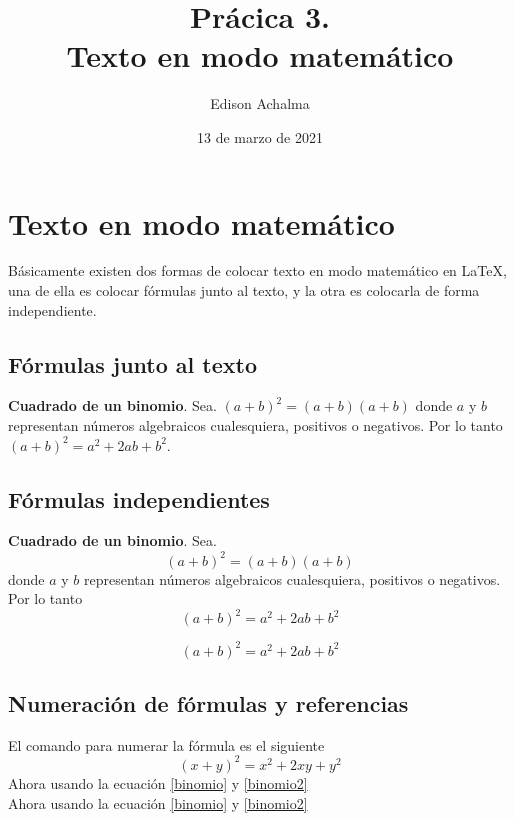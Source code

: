 \documentclass[12pt]{article}
\begin{document}
\title{Prácica 3. \\ Texto en modo matemático}
\author{Edison Achalma}
\date{13 de marzo de 2021}
\maketitle
\tableofcontents
\section{Texto en modo matemático}
Básicamente existen dos formas de colocar texto en modo matemático en \LaTeX, una de ella es colocar fórmulas junto al texto, y la otra es colocarla de forma independiente.

\subsection{Fórmulas junto al texto}
\textbf{Cuadrado de un binomio}. Sea. $ (a+b)^{2} = (a+b)(a+b) $ donde $ a $ y $ b $ representan números algebraicos cualesquiera, positivos o negativos. Por lo tanto $ (a+b)^{2} =a^{2}+2ab+b^{2}$.

\subsection{Fórmulas independientes}
\textbf{Cuadrado de un binomio}. Sea. 
\[
(a+b)^{2} = (a+b)(a+b)
\]
donde $ a $ y $ b $ representan números algebraicos cualesquiera, positivos o negativos. Por lo tanto 
\[
(a+b)^{2} =a^{2}+2ab+b^{2}
\]


\begin{equation}\label{binomio}
(a+b)^{2} =a^{2}+2ab+b^{2}
\end{equation}

\subsection{Numeración de fórmulas y referencias}
El comando para numerar la fórmula es el siguiente
\begin{equation}\label{binomio2}
(x+y)^{2} =x^{2}+2xy+y^{2}
\end{equation}
Ahora usando la ecuación \ref{binomio} y \ref{binomio2} \\ 
Ahora usando la ecuación \eqref{binomio} y \eqref{binomio2}
\end{document}
